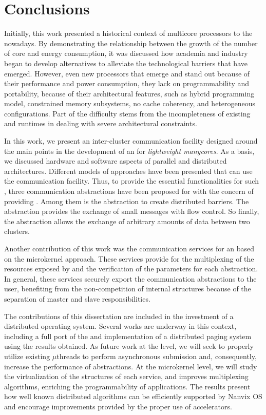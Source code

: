 \chapter{Conclusions}
\label{ch.conclusions}

	Initially, this work presented a historical context of multicore processors
    to the nowadays. By demonstrating the relationship between the growth of the
    number of core and energy consumption, it was discussed how academia and
    industry began to develop alternatives to alleviate the technological barriers
    that have emerged. However, even new processors that emerge and stand out
    because of their performance and power consumption, they lack on programmability
    and portability, because of their architectural features, such as hybrid
    programming model, constrained memory subsystems, no cache coherency, and
    heterogeneous configurations. Part of the difficulty stems from the
    incompleteness of existing \oss and runtimes in dealing with severe
    architectural constraints.

	In this work, we present an inter-cluster communication facility designed
    around the main points in the development of an \os for
    \textit{lightweight manycores}. As a basis, we discussed hardware and software
    aspects of parallel and distributed architectures. Different models of \os
    approaches have been presented that can use the communication facility.
    Thus, to provide the essential functionalities for such \oss, three
    communication abstractions have been proposed for \hal with the concern of
    providing \qos. Among them is the \sync abstraction to create distributed
    barriers. The \mailbox abstraction provides the exchange of small messages
    with flow control. So finally, the \portal abstraction allows the exchange
    of arbitrary amounts of data between two clusters.

	Another contribution of this work was the communication services for an \os
    based on the microkernel approach. These services provide for the multiplexing
    of the resources exposed by \hal and the verification of the parameters for
    each abstraction. In general, these services securely export the communication
    abstractions to the user, benefiting from the non-competition of \os internal
    structures because of the separation of master and slave responsibilities.

	The contributions of this dissertation are included in the investment of a
    distributed operating system. Several works are underway in this context,
    including a full port of the \mpi and implementation of a distributed paging
    system using the results obtained. As future work at the \hal level, we will
    seek to properly utilize existing \dma $\mu$threads to perform asynchronous
    submission and, consequently, increase the performance of abstractions. At
    the microkernel level, we will study the virtualization of the structures of
    each service, and improves multiplexing algorithms, enriching the
    programmability of applications. The results present how well known
    distributed algorithms can be efficiently supported by Nanvix OS and
    encourage improvements provided by the proper use of \dma accelerators.